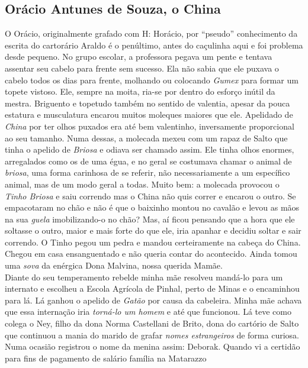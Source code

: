 \documentclass[12pt,brazil,]{book}
\begin{document}
\subsection{Orácio Antunes de Souza, o
China}\label{oruxe1cio-antunes-de-souza-o-china}

O Orácio, originalmente grafado com H: Horácio, por ``pseudo''
conhecimento da escrita do cartorário Araldo é o penúltimo, antes do
caçulinha aqui e foi problema desde pequeno. No grupo escolar, a
professora pegava um pente e tentava assentar seu cabelo para frente sem
sucesso. Ela não sabia que ele puxava o cabelo todos os dias para
frente, molhando ou colocando \emph{Gumex} para formar um topete
vistoso. Ele, sempre na moita, ria-se por dentro do esforço inútil da
mestra. Briguento e topetudo também no sentido de valentia, apesar da
pouca estatura e musculatura encarou muitos moleques maiores que ele.
Apelidado de \emph{China} por ter olhos puxados era até bem valentinho,
inversamente proporcional ao seu tamanho. Numa dessas, a molecada mexeu
com um rapaz de Salto que tinha o apelido de \emph{Briosa} e odiava ser
chamado assim. Ele tinha olhos enormes, arregalados como os de uma égua,
e no geral se costumava chamar o animal de \emph{briosa}, uma forma
carinhosa de se referir, não necessariamente a um específico animal, mas
de um modo geral a todas. Muito bem: a molecada provocou o \emph{Tinho
Briosa} e saiu correndo mas o China não quis correr e encarou o outro.
Se empacotaram no chão e não é que o baixinho montou no cavalão e levou
as mãos na sua \emph{guela} imobilizando-o no chão? Mas, aí ficou
pensando que a hora que ele soltasse o outro, maior e mais forte do que
ele, iria apanhar e decidiu soltar e sair correndo. O Tinho pegou um
pedra e mandou certeiramente na cabeça do China. Chegou em casa
ensanguentado e não queria contar do acontecido. Ainda tomou uma
\emph{sova} da enérgica Dona Malvina, nossa querida Mamãe.\\
Diante do seu temperamento rebelde minha mãe resolveu mandá-lo para um
internato e escolheu a Escola Agrícola de Pinhal, perto de Minas e o
encaminhou para lá. Lá ganhou o apelido de \emph{Gatão} por causa da
cabeleira. Minha mãe achava que essa internação iria \emph{torná-lo um
homem} e até que funcionou. Lá teve como colega o Ney, filho da dona
Norma Castellani de Brito, dona do cartório de Salto que continuou a
mania do marido de grafar \emph{nomes estrangeiros} de forma curiosa.
Numa ocasião registrou o nome da menina assim: Deborak. Quando vi a
certidão para fins de pagamento de salário família na Matarazzo
\end{document}
